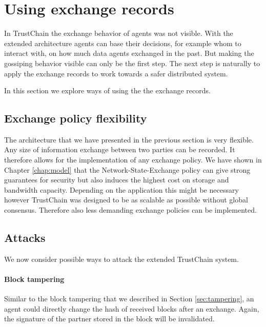 
\section{Using exchange records}
In TrustChain the exchange behavior of agents was not visible. With the extended
architecture agents can base their decisions, for example whom to interact with, on how much data 
agents exchanged in the past. But making the gossiping behavior visible can only be the first step. 
The next step is naturally to apply the exchange records to work towards a safer distributed system.

In this section we explore ways of using the the exchange records. 

\subsection{Exchange policy flexibility}
The architecture that we have presented in the previous section is very flexible. Any size of information 
exchange between two parties can be recorded. It therefore allows for the implementation of any 
exchange policy. We have shown in Chapter \ref{chap:model} that the Network-State-Exchange policy
can give strong guarantees for security but also induces the highest cost on storage and bandwidth 
capacity. Depending on the application this might be necessary however TrustChain was designed to 
be as scalable as possible without global consensus. Therefore also less demanding exchange policies
can be implemented.  

\subsection{Attacks}
We now consider possible ways to attack the extended TrustChain system. 

\paragraph{Block tampering}
Similar to the block tampering that we described in Section \ref{sec:tampering}, an agent could 
directly change the hash of received blocks after an exchange. Again, the signature of the partner 
stored in the block will be invalidated. 

